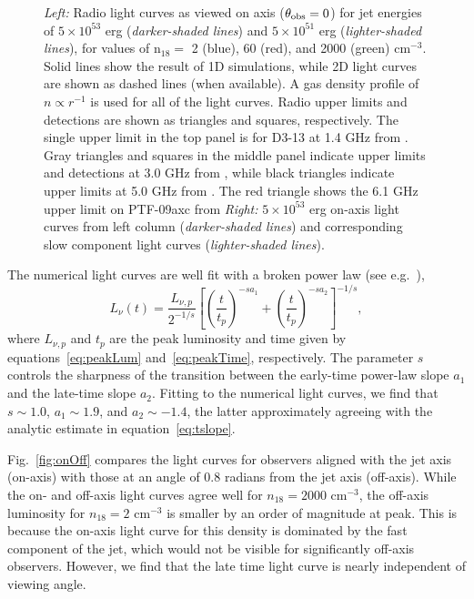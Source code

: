 \documentclass[usenatbib,fleqn]{mnras}
\begin{document}
\begin{figure}
  \caption{\label{fig:lightcurves} \textit{Left:} Radio light curves
    as viewed on axis ($\theta_{\rm obs}=0$) for jet energies of
    $5\times 10^{53}$ erg ({\it darker-shaded lines}) and $5\times
    10^{51}$ erg ({\it lighter-shaded lines}), for values of n$_{18}=$
    2 (blue), 60 (red), and 2000 (green) cm$^{-3}$.  Solid lines show
    the result of 1D simulations, while 2D light curves are shown as
    dashed lines (when available).  A gas density profile of $n\propto
    r^{-1}$ is used for all of the light curves.  Radio upper limits
    and detections are shown as triangles and squares, respectively.
    The single upper limit in the top panel is for D3-13 at 1.4 GHz
    from \citet{Bower2011}.  Gray triangles and squares in the middle
    panel indicate upper limits and detections at 3.0 GHz from
    \citet{Bower+2013}, while black triangles indicate upper limits at
    5.0 GHz from \citet{van-Velzen+2013}.  The red triangle shows the
    6.1 GHz upper limit on PTF-09axc from \citet{Arcavi+2014}
    \textit{Right:} $5\times 10^{53}$ erg on-axis light curves from
    left column ({\it darker-shaded lines}) and corresponding slow
    component light curves ({\it lighter-shaded lines}).}
\end{figure}

The numerical light curves are well fit with a broken power law (see
e.g.~\citealt{Leventis+2012}),
\begin{equation}
L_\nu (t) =\frac{L_{\nu, p}}{2^{-1/s}}
\left[\left(\frac{t}{t_p}\right)^{-s
    a_1}+\left(\frac{t}{t_p}\right)^{-s a_2}\right]^{-1/s}, 
\label{eq:lcAnal}\end{equation}
where $L_{\nu, p}$ and $t_p$ are the peak luminosity and time given by
equations~\eqref{eq:peakLum} and~\eqref{eq:peakTime}, respectively.
The parameter $s$ controls the sharpness of the transition between the
early-time power-law slope $a_1$ and the late-time slope $a_2$.
Fitting to the numerical light curves, we find that $s\sim 1.0$,
$a_1\sim 1.9$, and $a_2\sim -1.4$, the latter approximately agreeing
with the analytic estimate in equation~\eqref{eq:tslope}.


Fig.~\ref{fig:onOff} compares the light curves for observers aligned
with the jet axis (on-axis) with those at an angle of 0.8 radians from
the jet axis (off-axis).  While the on- and off-axis light curves
agree well for $n_{18}=2000$ cm$^{-3}$, the off-axis luminosity for
$n_{18}=2$ cm$^{-3}$ is smaller by an order of magnitude at peak.
This is because the on-axis light curve for this density is dominated
by the fast component of the jet, which would not be visible for
significantly off-axis observers. However, we find that the late time
light curve is nearly independent of viewing angle.
\end{document}
